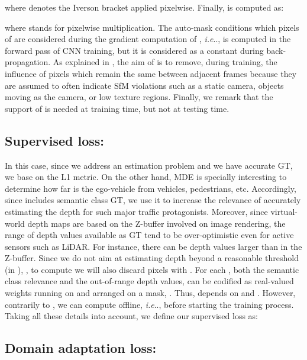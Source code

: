 \documentclass[journal]{IEEEtran}
\makeatletter
\DeclareRobustCommand\onedot{\futurelet\@let@token\@onedot}
\def\@onedot{\ifx\@let@token.\else.\null\fi\xspace}
\def\ie{\emph{i.e}\onedot} \def\Ie{\emph{I.e}\onedot}
\makeatother
\begin{document}
\noindent where  denotes the Iverson bracket applied pixelwise. Finally,  is computed as:

\noindent where  stands for pixelwise multiplication. The auto-mask  conditions which pixels of  are considered during the gradient computation of , {\ie},  is computed in the forward pass of CNN training, but it is considered as a constant during back-propagation. As explained in \cite{Godard:2019MonoDepth2}, the aim of  is to remove, during training, the influence of pixels which remain the same between adjacent frames because they are assumed to often indicate SfM violations such as a static camera, objects moving as the camera, or low texture regions. 
Finally, we remark that the support of  is needed at training time, but not at testing time.

\subsection{Supervised loss: }
\label{ssec:suploss}
In this case, since we address an estimation problem and we have accurate GT, we base  on the L1 metric. On the other hand, MDE is specially interesting to determine how far is the ego-vehicle from vehicles, pedestrians, etc. Accordingly, since  includes semantic class GT, we use it to increase the relevance of accurately estimating the depth for such major traffic protagonists. Moreover, since virtual-world depth maps are based on the Z-buffer involved on image rendering, the range of depth values available as GT tend to be over-optimistic even for active sensors such as LiDAR. For instance, there can be depth values larger than  in the Z-buffer. Since we do not aim at estimating depth beyond a reasonable threshold (in ), , to compute  we will also discard pixels  with . For each , both the semantic class relevance and the out-of-range depth values, can be codified as real-valued weights running on  and arranged on a mask, . Thus,  depends on  and . However, contrarily to , we can compute  offline, {\ie}, before starting the training process. Taking all these details into account, we define our supervised loss as:


\subsection{Domain adaptation loss: }
\label{ssec:daloss}
\end{document}
